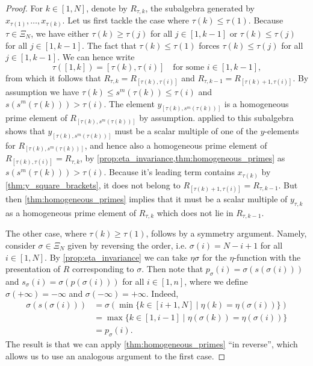 \begin{proof}

	For $k \in [1, N]$, denote by $R_{\tau, k}$, the subalgebra generated by $x_{\tau(1)},
		\dots, x_{\tau(k)}$. Let us first tackle the case where $\tau(k) \leq \tau(1)$. Because
	$\tau \in \Xi_N$, we have either $\tau(k) \geq \tau(j)$ for all $j\in [1, k - 1]$ or
	$\tau(k) \leq \tau(j)$ for all $j \in [1, k-1]$. The fact that $\tau(k) \leq \tau(1)$
	forces $\tau(k) \leq \tau(j)$ for all $j \in [1, k-1]$. We can hence write
	\begin{equation*}
		\tau([1, k]) = [\tau(k), \tau(i)] \quad \text{for some } i \in [1, k-1],
	\end{equation*}
	from which it follows that $R_{\tau, k} = R_{[\tau(k), \tau(i)]}$ and $R_{\tau, k-1} = R_{[\tau(k) + 1,\tau(i)]}$.
	By assumption we have $\tau(k) \leq s^m(\tau(k)) \leq \tau(i)$ and $s (s^m(\tau(k))) >
		\tau(i)$. The element $y_{[\tau(k), s^m(\tau(k))]}$ is a homogeneous prime element of
	$R_{[\tau(k), s^m(\tau(k))]}$ by assumption.  applied to
	this subalgebra shows that $y_{[\tau(k), s^m(\tau(k))]}$ must be a scalar multiple of
	one of the $y$-elements for $R_{[\tau(k), s^m(\tau(k))]}$, and hence also a homogeneous
	prime element of $R_{[\tau(k), \tau(i)]} = R_{\tau, k}$, by
	\cref{prop:eta_invariance,thm:homogeneous_primes} as $s(s^m(\tau(k))) > \tau(i)$.
	Because it's leading term contains $x_{\tau(k)}$ by \cref{thm:y_square_brackets}, it
	does not belong to $R_{[\tau(k) + 1, \tau(i)]} = R_{\tau, k-1}$. But then
	\cref{thm:homogeneous_primes} implies that it must be a scalar multiple of $y_{\tau,
				k}$ as a homogeneous prime element of $R_{\tau, k}$ which does not lie in $R_{\tau,
				k-1}$.

	The other case, where $\tau(k) \geq \tau(1)$, follows by a symmetry argument. Namely,
	consider $\sigma \in \Xi_N$ given by reversing the order, i.e. $\sigma(i) = N- i + 1$
	for all $i \in [1, N]$. By \cref{prop:eta_invariance} we can take $\eta \sigma$ for the
	$\eta$-function with the presentation of $R$ corresponding to $\sigma$. Then note that
	$p_\sigma (i) = \sigma (s(\sigma(i)))$ and $s_\sigma (i) = \sigma(p(\sigma(i)))$ for
	all $i\in [1, n]$, where we define $\sigma(+\infty) = -\infty$ and $\sigma(-\infty) =
		+\infty$. Indeed,
	\begin{align*}
		\sigma(s(\sigma(i))) & = \sigma\left(\min \{k \in [i+1, N]\mid \eta(k) = \eta(\sigma(i))\}\right) \\
		                     & = \max\{k \in [1, i-1] \mid \eta(\sigma(k)) = \eta(\sigma(i))\}            \\
		                     & = p_\sigma(i).
	\end{align*}
	The result is that we can apply \cref{thm:homogeneous_primes} ``in reverse'', which
	allows us to use an analogous argument to the first case.
\end{proof}

